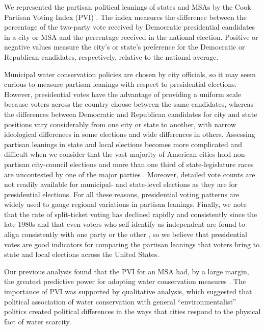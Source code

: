 \documentclass[draft,linenumbers]{agujournal}
\begin{document}
We represented the partisan political leanings of states and MSAs by the
Cook Partisan Voting Index (PVI) \citep{cook:pvi:2013}. The index measures
the difference between the percentage of the two-party vote received by
Democratic presidential candidates in a city or MSA and the percentage received
in the national election. Positive or negative values measure the
city's or state's preference for the Democratic or Republican candidates,
respectively, relative to the national average.

Municipal water conservation policies are chosen by city officials, so it
may seem curious to measure partisan leanings with respect to presidential
elections. However, presidential votes have the advantage of providing a uniform
scale because voters across the country choose between the same candidates,
whereas the differences between Democratic and Republican candidates for
city and state positions vary considerably from one city or state to another,
with narrow ideological differences in some elections and wide differences in
others. Assessing partisan leanings in state and local
elections becomes more complicated and difficult when we consider that
the vast majority of American cities hold non-partisan city-council elections
\citep{svara:city.councils:2003} and more than one third of state-legislature
races are uncontested by one of the major parties
\citep{klarner:state.elections:2015,ap:uncontested:2006}.
Moreover, detailed vote
counts are not readily available for municipal- and state-level elections as
they are for presidential elections. For all these reasons, presidential
voting patterns are widely used to gauge regional variations in partisan
leanings.
Finally, we note that the rate of split-ticket voting has declined rapidly
and consistently since the late 1980s \citep{fiorina:renationalization:2016}
and that even voters who self-identify as independent are found to align
consistently with one party or the other \citep{hawkins:motivated:2012},
so we believe that
presidential votes are good indicators for comparing the partisan leanings
that voters bring to state and local elections across the United States.

%
Our previous analysis found that the PVI for an MSA had, by a large margin,
the greatest predictive power for adopting water conservation measures
\cite{hess:drought:2016}.
The importance of PVI
was supported by qualitative analysis, which suggested that political
association of water conservation with general ``environmentalist'' politics
created political differences in the ways that cities respond to the physical
fact of water scarcity.
\end{document}
